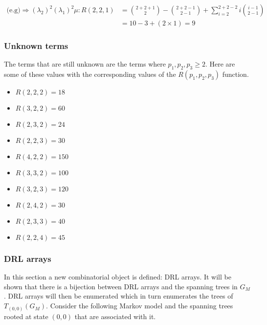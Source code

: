\begin{align}
    \text{(e.g)} \Rightarrow (\lambda_2)^2 (\lambda_1)^2 \mu:
    R(2,2,1) & = \binom{2+2+1}{2} - \binom{2+2-1}{2-1} + \sum_{i=2}^{2+2-2}
    i\binom{i-1}{2-1} \nonumber \\
    & = 10 - 3 + (2 \times 1) = 9 \nonumber
\end{align}
\normalsize

\subsubsection{Unknown terms}

The terms that are still unknown are the terms where \(p_1, p_2, p_3 \geq 2\).
Here are some of these values with the corresponding values of the
\(R(p_1,p_2,p_3)\) function.

\begin{multicols}{2}
    \begin{itemize}
        \item \(R(2,2,2) = 18\)
        \item \(R(3,2,2) = 60\)
        \item \(R(2,3,2) = 24\)
        \item \(R(2,2,3) = 30\)
        \item \(R(4,2,2) = 150\)
        \item \(R(3,3,2) = 100\)
        \item \(R(3,2,3) = 120\)
        \item \(R(2,4,2) = 30\)
        \item \(R(2,3,3) = 40\)
        \item \(R(2,2,4) = 45\)
    \end{itemize}
\end{multicols}

\subsubsection{DRL arrays}

In this section a new combinatorial object is defined: DRL arrays.
It will be shown that there is a bijection between DRL arrays and the spanning
trees in \(G_M\).
DRL arrays will then be enumerated which in turn enumerates the trees of
\(T_{(0,0)}(G_M)\).
Consider the following Markov model and the spanning trees rooted at state
\((0,0)\) that are associated with it.

